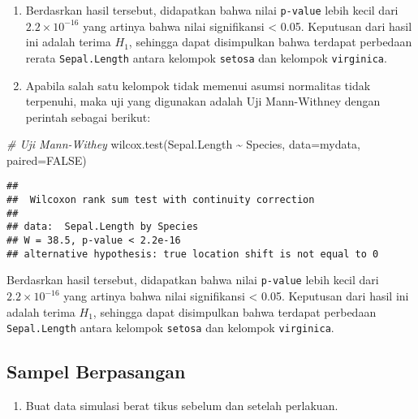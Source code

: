 \documentclass[
]{book}
\newenvironment{Shaded}{\begin{snugshade}}{\end{snugshade}}
\newcommand{\AttributeTok}[1]{\textcolor[rgb]{0.77,0.63,0.00}{#1}}
\newcommand{\CommentTok}[1]{\textcolor[rgb]{0.56,0.35,0.01}{\textit{#1}}}
\newcommand{\ConstantTok}[1]{\textcolor[rgb]{0.00,0.00,0.00}{#1}}
\newcommand{\FunctionTok}[1]{\textcolor[rgb]{0.00,0.00,0.00}{#1}}
\newcommand{\NormalTok}[1]{#1}
\newcommand{\SpecialCharTok}[1]{\textcolor[rgb]{0.00,0.00,0.00}{#1}}
\providecommand{\tightlist}{%
  \setlength{\itemsep}{0pt}\setlength{\parskip}{0pt}}
\begin{document}
\begin{enumerate}
\def\labelenumi{\arabic{enumi}.}
\setcounter{enumi}{6}
\item
  Berdasrkan hasil tersebut, didapatkan bahwa nilai \texttt{p-value} lebih kecil dari \(2.2 \times 10^{-16}\) yang artinya bahwa nilai signifikansi \textless{} 0.05. Keputusan dari hasil ini adalah terima \(H_1\), sehingga dapat disimpulkan bahwa terdapat perbedaan rerata \texttt{Sepal.Length} antara kelompok \texttt{setosa} dan kelompok \texttt{virginica}.
\item
  Apabila salah satu kelompok tidak memenui asumsi normalitas tidak terpenuhi, maka uji yang digunakan adalah Uji Mann-Withney dengan perintah sebagai berikut:
\end{enumerate}

\begin{Shaded}
\begin{Highlighting}[]
\CommentTok{\# Uji Mann{-}Withey}
\FunctionTok{wilcox.test}\NormalTok{(Sepal.Length }\SpecialCharTok{\textasciitilde{}}\NormalTok{ Species, }\AttributeTok{data=}\NormalTok{mydata, }\AttributeTok{paired=}\ConstantTok{FALSE}\NormalTok{)}
\end{Highlighting}
\end{Shaded}

\begin{verbatim}
## 
##  Wilcoxon rank sum test with continuity correction
## 
## data:  Sepal.Length by Species
## W = 38.5, p-value < 2.2e-16
## alternative hypothesis: true location shift is not equal to 0
\end{verbatim}

Berdasrkan hasil tersebut, didapatkan bahwa nilai \texttt{p-value} lebih kecil dari \(2.2 \times 10^{-16}\) yang artinya bahwa nilai signifikansi \textless{} 0.05. Keputusan dari hasil ini adalah terima \(H_1\), sehingga dapat disimpulkan bahwa terdapat perbedaan \texttt{Sepal.Length} antara kelompok \texttt{setosa} dan kelompok \texttt{virginica}.

\hypertarget{sampel-berpasangan-1}{%
\subsection{Sampel Berpasangan}\label{sampel-berpasangan-1}}

\begin{enumerate}
\def\labelenumi{\arabic{enumi}.}
\tightlist
\item
  Buat data simulasi berat tikus sebelum dan setelah perlakuan.
\end{enumerate}
\end{document}
